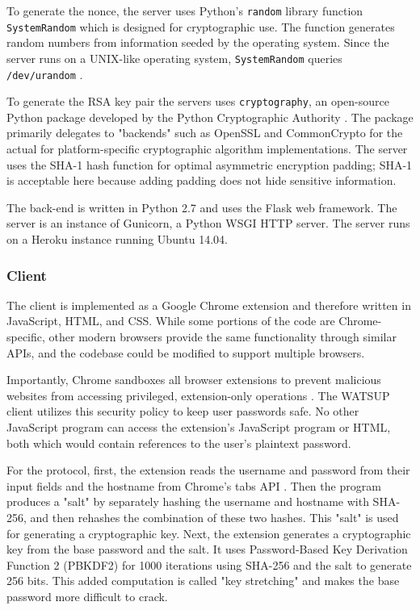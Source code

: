 To generate the nonce, the server uses Python's \texttt{random} library function \texttt{SystemRandom} which is designed for cryptographic use. The function generates random numbers from information seeded by the operating system. Since the server runs on a UNIX-like operating system, \texttt{SystemRandom} queries \texttt{/dev/urandom} \cite{Python:2017:SystemRandom, Python:2017:urandom}.

To generate the RSA key pair the servers uses \texttt{cryptography}, an open-source Python package developed by the Python Cryptographic Authority \cite{PCA:2017}. The package primarily delegates to "backends" such as OpenSSL and CommonCrypto for the actual for platform-specific cryptographic algorithm implementations. The server uses the SHA-1 hash function for optimal asymmetric encryption padding; SHA-1 is acceptable here because adding padding does not hide sensitive information.

The back-end is written in Python 2.7 and uses the Flask web framework. The server is an instance of Gunicorn, a Python WSGI HTTP server. The server runs on a Heroku instance running Ubuntu 14.04.

\subsubsection{Client}

The client is implemented as a Google Chrome extension and therefore written in JavaScript, HTML, and CSS. While some portions of the code are Chrome-specific, other modern browsers provide the same functionality through similar APIs, and the codebase could be modified to support multiple browsers.

Importantly, Chrome sandboxes all browser extensions to prevent malicious websites from accessing privileged, extension-only operations \cite{Google:2017:contentSecurityPolicy}. The WATSUP client utilizes this security policy to keep user passwords safe. No other JavaScript program can access the extension's JavaScript program or HTML, both which would contain references to the user's plaintext password.

For the protocol, first, the extension reads the username and password from their input fields and the hostname from Chrome's tabs API \cite{Google:2017:tabs}. Then the program produces a "salt" by separately hashing the username and hostname with SHA-256, and then rehashes the combination of these two hashes. This "salt" is used for generating a cryptographic key. Next, the extension generates a cryptographic key from the base password and the salt. It uses Password-Based Key Derivation Function 2 (PBKDF2) for 1000 iterations using SHA-256 and the salt to generate 256 bits. This added computation is called "key stretching" and makes the base password more difficult to crack.

